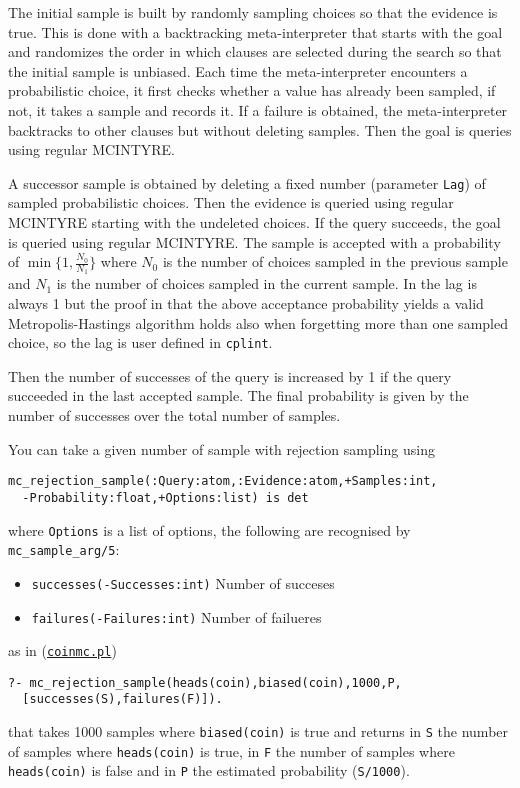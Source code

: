The initial sample is built by  randomly sampling choices so that the evidence is true. This is done with
a backtracking meta-interpreter that starts with the goal and
randomizes the order in which clauses are selected during the search so that the initial sample is unbiased. Each time the meta-interpreter encounters
a probabilistic choice, it first checks whether a
value has already been sampled, if not, it takes
a sample and records it. If a failure is obtained,
the meta-interpreter backtracks to other clauses but
without deleting samples. Then the goal is queries using
regular MCINTYRE.

A successor sample is obtained by deleting a
fixed number (parameter \verb|Lag|) of sampled probabilistic choices. Then the
evidence is queried using regular MCINTYRE starting with the undeleted choices.
If the query succeeds, the goal is queried using regular MCINTYRE.
The sample is accepted with a probability of $\min\{1,\frac{N_0}{N_1}\}$ where $N_0$ is the number of choices sampled
in the previous sample and $N_1$ is the number of choices sampled in the current sample.
In \cite{nampally2014adaptive} the lag is always 1 but the proof in \cite{nampally2014adaptive} that the above acceptance
probability yields a valid
Metropolis-Hastings algorithm holds also when forgetting more than one
sampled choice, so the lag is
user defined in \verb|cplint|.

Then the number of successes of the query is increased by 1 if the query succeeded in the last accepted
sample. The final probability is given by the number of successes over the total
number of samples.

You can take a given number of sample with rejection sampling using
\begin{verbatim}
mc_rejection_sample(:Query:atom,:Evidence:atom,+Samples:int,
  -Probability:float,+Options:list) is det
\end{verbatim}
where
\verb|Options| is a list of options, the following are recognised by \verb|mc_sample_arg/5|:
\begin{itemize}
\item \verb|successes(-Successes:int)|
Number of succeses
\item \verb|failures(-Failures:int)|
Number of failueres
\end{itemize}
as in (\href{http://cplint.eu/example/inference/coinmc.pl}{\texttt{coinmc.pl}})
\begin{verbatim}
?- mc_rejection_sample(heads(coin),biased(coin),1000,P,
  [successes(S),failures(F)]).
\end{verbatim}
that takes 1000 samples where \verb|biased(coin)| is true and returns in \verb|S| the number of samples where
\verb|heads(coin)| is true, in \verb|F| the number of samples where \verb|heads(coin)| is false and in \verb|P| the
estimated probability (\verb|S/1000|).

